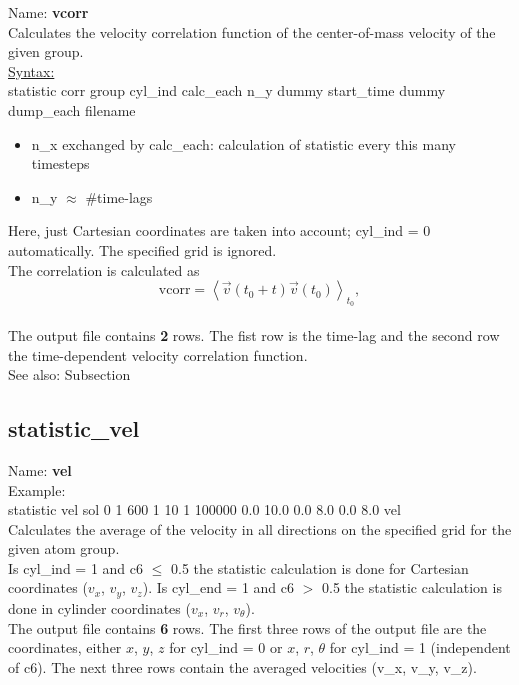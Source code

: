 \documentclass[a4paper,10pt]{scrreprt}
\begin{document}
Name: {\bfseries vcorr}
\\[2ex]
Calculates the velocity correlation function of the center-of-mass velocity of the given group.
\\[2ex]
\underline{Syntax:}\\
statistic	corr group cyl\_ind calc\_each n\_y dummy start\_time dummy dump\_each filename
\begin{itemize}
\item n\_x exchanged by calc\_each: calculation of statistic every this many timesteps
\item n\_y $\approx$ \#time-lags
\end{itemize} 
Here, just Cartesian coordinates are taken into account; cyl\_ind = 0 automatically.
The specified grid is ignored.\\
The correlation is calculated as
\begin{equation}
\mathrm{vcorr} = \left \langle \vec{v}(t_0 + t) \vec{v}(t_0)  \right \rangle _{t_0},
\label{eq:vcorr}
\end{equation}
\\[2ex]
The output file contains {\bfseries 2} rows.
The fist row is the time-lag and the second row the time-dependent velocity correlation function.
\\[2ex]
See also: Subsection 


\subsection{statistic\_vel}

Name: {\bfseries vel}
\\[2ex]
Example:
\\[0.5ex]
statistic       vel sol 0 1 600 1 10 1 100000 0.0 10.0 0.0 8.0 0.0 8.0 vel
\\[2ex]
Calculates the average of the velocity in all directions on the specified grid for the given atom group.
\\[2ex]
Is cyl\_ind = 1 and c6 $\le$ 0.5 the statistic calculation is done for Cartesian coordinates ($v_x$, $v_y$, $v_z$).
Is cyl\_end = 1 and c6 $>$ 0.5 the statistic calculation is done in cylinder coordinates ($v_x$, $v_r$, $v_{\theta}$).
\\[2ex]
The output file contains {\bfseries 6} rows.
The first three rows of the output file are the coordinates, either $x$, $y$, $z$ for cyl\_ind = 0 or $x$, $r$, $\theta$ for cyl\_ind = 1 (independent of c6).
The next three rows contain the averaged velocities (v\_x, v\_y, v\_z).
\end{document}
